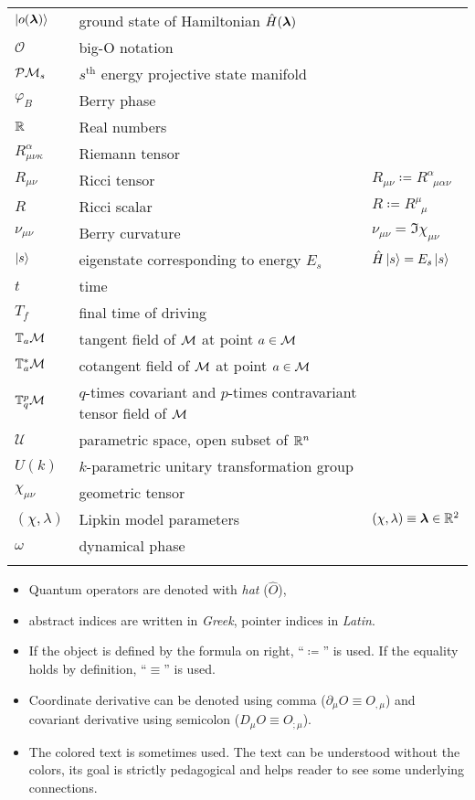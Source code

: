 \begin{tabular} {@{}C{1.9cm}@{}p{8cm}@{}C{3.77cm}}
	  $\ket{o({\bm\lambda})}$& ground state of Hamiltonian $\hat{H}({\bm\lambda})$  &  \\
	  $\mathcal O$& big-O notation  &  \\
	  $\mathcal{P}\mathcal{M}_s$& $s^{\text{th}}$ energy projective state manifold &  \\
	  $\varphi_B$ & Berry phase & \\
	  $\mathbb{R}$& Real numbers  &  \\
	  $R^\alpha_{\mu\nu\kappa}$ &Riemann tensor & \\
	  $R_{\mu\nu}$ & Ricci tensor & $R_{\mu\nu}\coloneqq R^\alpha_{\;\;\mu\alpha\nu}$\\
	  $R$ & Ricci scalar & $R\coloneqq R^\mu_{\;\;\mu}$\\
	  $\nu_{\mu\nu}$ & Berry curvature & $\nu_{\mu\nu}= \Im\chi_{\mu\nu}$ \\ 
	  $\ket{s}$& eigenstate corresponding to energy $E_s$& $\hat{H}\ket{s}=E_s\ket{s}$ \\
	  $t$& time  &  \\
	  $T_f$& final time of driving  &  \\
	  $\mathbb T_a \mathcal{M}$& tangent field of $\mathcal{M}$ at point $a\in \mathcal{M}$ &  \\
	  $\mathbb T_a^* \mathcal{M}$& cotangent field of $\mathcal{M}$ at point $a\in \mathcal{M}$ &  \\
	  $\mathbb{T}^p_q\mathcal{M}$& $q$-times covariant and $p$-times contravariant tensor field of $\mathcal{M}$&  \\
	  $\mathcal U$& parametric space, open subset of $\mathbb{R}^n$  & \\
	  $U(k)$& $k$-parametric unitary transformation group  &  \\
	  $\chi_{\mu\nu}$ &geometric tensor &  \\
	  $(\chi,\lambda)$&Lipkin model parameters  & $(\chi,\lambda)\equiv {\bm\lambda}\in\mathbb{R}^2$ \\
		$\omega$ & dynamical phase \\
\bottomrule
{}
\end{tabular}

\begin{itemize}
	\item Quantum operators are denoted with \emph{hat} ($\hat O$), 
	\item abstract indices are written in \emph{Greek}, pointer indices in \emph{Latin}. 
	\item If the object is defined by the formula on right, “$\coloneqq$” is used. If the equality holds by definition, “$\equiv$” is used. 
	\item Coordinate derivative can be denoted using comma ($\partial_\mu O\equiv O_{,\mu}$) and covariant derivative using semicolon ($D_\mu O\equiv O_{;\mu}$). 
	\item The colored text is sometimes used. The text can be understood without the colors, its goal is strictly pedagogical and helps reader to see some underlying connections.
\end{itemize}